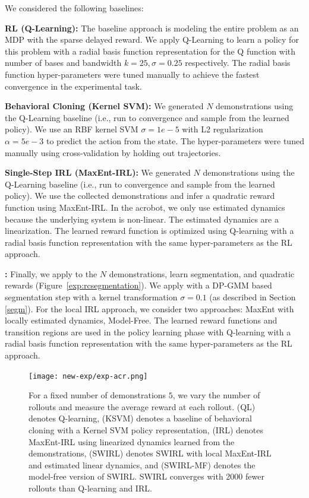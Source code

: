 We considered the following baselines:

\vspace{0.25em}\noindent \textbf{RL (Q-Learning): } The baseline approach is modeling the entire problem as an MDP with the sparse delayed reward. We apply Q-Learning to learn a policy for this problem with a radial basis function representation for the Q function with number of bases and bandwidth $k=25, \sigma=0.25$ respectively. The radial basis function hyper-parameters were tuned manually to achieve the fastest convergence in the experimental task. 

\vspace{0.25em}\noindent \textbf{Behavioral Cloning (Kernel SVM): } We generated $N$ demonstrations using the Q-Learning baseline (i.e., run to convergence and sample from the learned policy). We use an RBF kernel SVM $\sigma=1e-5$  with L2 regularization $\alpha=5e-3$ to predict the action from the state. The hyper-parameters were tuned manually using cross-validation by holding out trajectories.

\vspace{0.25em}\noindent \textbf{Single-Step IRL (MaxEnt-IRL): } We generated $N$ demonstrations using the Q-Learning baseline (i.e., run to convergence and sample from the learned policy). We use the collected demonstrations and infer a quadratic reward function using MaxEnt-IRL. In the acrobot, we only use estimated dynamics because the underlying system is non-linear. The estimated dynamics are a linearization. The learned reward function is optimized using Q-learning with a radial basis function representation with the same hyper-parameters as the RL approach. 

\vspace{0.25em}\noindent \textbf{\hirl: } Finally, we apply \hirl to the $N$ demonstrations, learn segmentation, and quadratic rewards (Figure~\ref{exp:rcsegmentation}).
We apply \hirl with a DP-GMM based segmentation step with a kernel transformation $\sigma = 0.1$ (as described in Section \ref{segm}).
For the local IRL approach, we consider two approaches: MaxEnt with locally estimated dynamics, Model-Free. 
The learned reward functions and transition regions are used in the policy learning phase with Q-learning with a radial basis function representation with the same hyper-parameters as the RL approach.


\begin{figure}[t]
\centering
 \texttt{[image: new-exp/exp-acr.png]}
 \caption{For a fixed number of demonstrations $5$, we vary the number of rollouts and measure the average reward at each rollout. (QL) denotes Q-learning, (KSVM) denotes a baseline of behavioral cloning with a Kernel SVM policy representation, (IRL) denotes MaxEnt-IRL using linearized dynamics learned from the demonstrations, (SWIRL) denotes SWIRL with local MaxEnt-IRL and estimated linear dynamics, and (SWIRL-MF) denotes the model-free version of SWIRL. SWIRL converges with 2000 fewer rollouts than Q-learning and IRL. \label{exp:acr}}
\end{figure}


